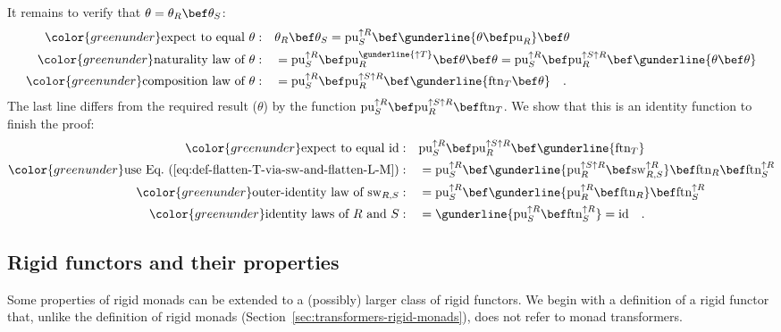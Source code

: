 It remains to verify that $\theta=\theta_{R}\bef\theta_{S}$:
\begin{align*}
{\color{greenunder}\text{expect to equal }\theta:}\quad & \theta_{R}\bef\theta_{S}=\text{pu}_{S}^{\uparrow R}\bef\gunderline{\theta\bef\text{pu}_{R}}\bef\theta\\
{\color{greenunder}\text{naturality law of }\theta:}\quad & =\text{pu}_{S}^{\uparrow R}\bef\text{pu}_{R}^{\gunderline{\uparrow T}}\bef\theta\bef\theta=\text{pu}_{S}^{\uparrow R}\bef\text{pu}_{R}^{\uparrow S\uparrow R}\bef\gunderline{\theta\bef\theta}\\
{\color{greenunder}\text{composition law of }\theta:}\quad & =\text{pu}_{S}^{\uparrow R}\bef\text{pu}_{R}^{\uparrow S\uparrow R}\bef\gunderline{\text{ftn}_{T}\bef\theta}\quad.
\end{align*}
The last line differs from the required result ($\theta$) by the
function $\text{pu}_{S}^{\uparrow R}\bef\text{pu}_{R}^{\uparrow S\uparrow R}\bef\text{ftn}_{T}$.
We show that this is an identity function to finish the proof:
\begin{align*}
{\color{greenunder}\text{expect to equal }\text{id}:}\quad & \text{pu}_{S}^{\uparrow R}\bef\text{pu}_{R}^{\uparrow S\uparrow R}\bef\gunderline{\text{ftn}_{T}}\\
{\color{greenunder}\text{use Eq.~(\ref{eq:def-flatten-T-via-sw-and-flatten-L-M})}:}\quad & =\text{pu}_{S}^{\uparrow R}\bef\gunderline{\text{pu}_{R}^{\uparrow S\uparrow R}\bef\text{sw}_{R,S}^{\uparrow R}}\bef\text{ftn}_{R}\bef\text{ftn}_{S}^{\uparrow R}\\
{\color{greenunder}\text{outer-identity law of }\text{sw}_{R,S}:}\quad & =\text{pu}_{S}^{\uparrow R}\bef\gunderline{\text{pu}_{R}^{\uparrow R}\bef\text{ftn}_{R}}\bef\text{ftn}_{S}^{\uparrow R}\\
{\color{greenunder}\text{identity laws of }R\text{ and }S:}\quad & =\gunderline{\text{pu}_{S}^{\uparrow R}\bef\text{ftn}_{S}^{\uparrow R}}=\text{id}\quad.
\end{align*}


\subsection{Rigid functors and their properties\label{subsec:Rigid-functors}}

Some properties of rigid monads can be extended to a (possibly) larger
class of rigid functors. We begin with a definition of a rigid functor
that, unlike the definition of rigid monads (Section~\ref{sec:transformers-rigid-monads}),
does not refer to monad transformers.

